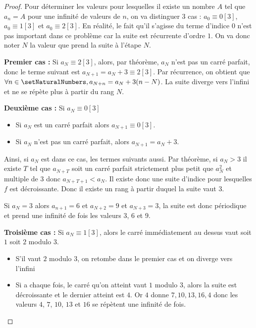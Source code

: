 \begin{proof}
Pour déterminer les valeurs pour lesquelles il existe un nombre $A$ tel que $a_n = A$ pour une infinité de valeurs de $n$, on va distinguer $3$ cas : $a_0 \equiv 0 [3]$, $a_0 \equiv 1 [3]$ et $a_0 \equiv 2 [3]$. En réalité, le fait qu'il s'agisse du terme d'indice $0$ n'est pas important dans ce problème car la suite est récurrente d'ordre $1$. On va donc noter $N$ la valeur que prend la suite à l'étape $N$.

\textbf{Premier cas :} Si $a_{N} \equiv 2 [3]$, alors, par théorème, $a_N$ n'est pas un carré parfait, donc le terme suivant est $a_{N+1} = a_{N} + 3 \equiv 2 [3]$. Par récurrence, on obtient que $\forall n \in \setNaturalNumbers, a_{N+n} = a_{N} + 3 (n - N)$. La suite diverge vers l'infini et ne se répète plus à partir du rang $N$. 

\textbf{Deuxième cas :} Si $a_{N} \equiv 0 [3]$
\begin{itemize}
\item Si $a_{N}$ est un carré parfait alors $a_{N+1} \equiv 0 [3]$.
\item Si $a_{N}$ n'est pas un carré parfait, alors $a_{N+1} = a_{N} + 3$. 
\end{itemize}
Ainsi, si $a_{N}$ est dans ce cas, les termes suivants aussi. Par théorème, si $a_{N} > 3$ il existe $T$ tel que $a_{N+T}$ soit un carré parfait strictement plus petit que $a_{N}^2$ et multiple de $3$ donc $a_{N+T+1} < a_{N}$. Il existe donc une suite d'indice pour lesquelles $f$ est décroissante. Donc il existe un rang à partir duquel la suite vaut $3$.

Si $a_{N} = 3$ alors $a_{n+1} = 6$ et $a_{N+2} = 9$ et $a_{N+3} = 3$, la suite est donc périodique et prend une infinité de fois les valeurs $3$, $6$ et $9$.

\textbf{Troisième cas :} Si $a_{N} \equiv 1 [3]$, alors le carré immédiatement au dessus vaut soit $1$ soit $2$ modulo $3$. 
\begin{itemize}
\item S'il vaut $2$ modulo $3$, on retombe dans le premier cas et on diverge vers l'infini
\item Si a chaque fois, le carré qu'on atteint vaut $1$ modulo $3$, alors la suite est décroissante et le dernier atteint est $4$. Or $4$ donne $7, 10, 13, 16, 4$ donc les valeurs $4$, $7$, $10$, $13$ et $16$ se répètent une infinité de fois.  
\end{itemize}
\end{proof}